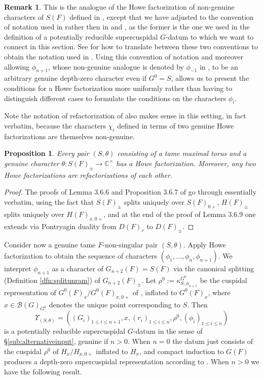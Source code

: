 \documentclass{article}
\def\C{\mathbb{C}}
\def\sB{\mathcal{B}} \def\ra{\rightarrow}
\newtheorem{pro}[thm]{Proposition}
\theoremstyle{definition}
\newtheorem{rem}[thm]{Remark}
\numberwithin{equation}{subsection}
\renewcommand{\-}{\hyp{}}
\begin{document}
\begin{rem}
	 This is the analogue of the Howe factorization of non-genuine characters of $S(F)$ defined in \cite[\S3.6]{KalRSP}, except that we have adjusted to the convention of notation used in \cite{Fin21, Fin21Comp, FS25} rather then in \cite{Yu01} and \cite{KalRSP}, as the former is the one we used in the definition of a potentially reducible supercuspidal $G$-datum to which we want to connect in this section.  See \cite[Remark~2.4]{Fin21Comp} for how to translate between these two conventions to obtain the notation used in \cite{KalRSP}. Using this convention of notation and moreover allowing $\phi_{n+1}$, whose non-genuine analogue is denoted by $\phi_{-1}$ in \cite{KalRSP}, to be an arbitrary genuine depth-zero character even if $G^0=S$, allows us to present the conditions for a Howe factorization more uniformly rather than having to distinguish different cases to formulate the conditions on the characters $\phi_i$.
\end{rem}

Note the notation of refactorization of \cite[Definition 4.19]{HM08} also makes sense in this setting, in fact verbatim, because the characters $\chi_i$ defined in terms of two genuine Howe factorizations are themselves non-genuine. 

\begin{pro}
	Every pair $(S,\theta)$ consisting of a tame maximal torus and a genuine character $\theta : S(F)_\pm \to \C^\times$ has a Howe factorization. Moreover, any two Howe factorizations are refactorizations of each other.
\end{pro}
\begin{proof}
	The proofs of Lemma 3.6.6 and Proposition 3.6.7 of \cite{KalRSP} go through essentially verbatim, using the fact that $S(F)_\pm$ splits uniquely over $S(F)_{0+}$, $H(F)_\pm$ splits uniquely over $H(F)_{x,0+}$, and at the end of the proof of Lemma 3.6.9 one extends via Pontryagin duality from $D(F)_r$ to $D(F)_\pm$.
\end{proof}








Consider now a genuine tame $F$-non-singular pair $(S,\theta)$. Apply Howe factorization to obtain the sequence of characters $(\phi_1,\dots,\phi_n, \phi_{n+1})$. 
We interpret $\phi_{n+1}$ as a character of $G_{n+2}(F)=S(F)$ via the canonical splitting (Definition \ref{dfn:splitunram}) of $G_{n+2}(F)_{\pm}$. Let $\rho^0:=\kappa_{S,\phi_{n+1}}^{G^0}$ be the cuspidal representation of $G^0(F)_x/G^0(F)_{x,0+}$ of \cite[Definition 2.6.8]{KalSLP}, inflated to  $G^0(F)_x$, where $x \in \sB(G)_{G^0}$ denotes the unique point corresponding to $S$.
Then
\[ \Upsilon_{(S,\theta)}= ((G_i)_{1\leq i\leq n+1},x,(r_i)_{1\leq i\leq n},\rho^0,(\phi_i)_{1\leq i\leq n})\]
is a potentially reducible supercuspidal $G$-datum in the sense of \S\ref{sub:alternativeinput}, genuine if $n>0$. When $n=0$ the datum just consists of the cuspidal $\rho^0$ of $H_x/H_{x,0+}$ inflated to $H_x$, and compact induction to $G(F)$ produces a depth-zero supercuspidal representation according to \cite{MP96}. When $n>0$ we have the following result.
\end{document}
